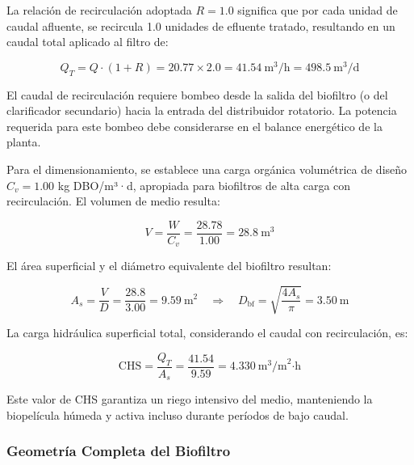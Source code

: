 \documentclass[12pt,a4paper]{article}
\begin{document}
La relación de recirculación adoptada $R = 1.0$ significa que por cada unidad de caudal afluente, se recircula 1.0 unidades de efluente tratado, resultando en un caudal total aplicado al filtro de:

\begin{equation}
Q_T = Q \cdot (1 + R) = 20.77 \times 2.0 = 41.54\ \text{m}^3\text{/h} = 498.5\ \text{m}^3\text{/d}
\end{equation}

El caudal de recirculación requiere bombeo desde la salida del biofiltro (o del clarificador secundario) hacia la entrada del distribuidor rotatorio. La potencia requerida para este bombeo debe considerarse en el balance energético de la planta.

Para el dimensionamiento, se establece una carga orgánica volumétrica de diseño $C_v = 1.00$ kg DBO/m³·d, apropiada para biofiltros de alta carga con recirculación. El volumen de medio resulta:

\begin{equation}
V = \frac{W}{C_v} = \frac{28.78}{1.00} = 28.8\ \text{m}^3
\end{equation}

El área superficial y el diámetro equivalente del biofiltro resultan:

\begin{equation}
A_s = \frac{V}{D} = \frac{28.8}{3.00} = 9.59\ \text{m}^2 \quad \Rightarrow \quad D_{\text{bf}} = \sqrt{\frac{4A_s}{\pi}} = 3.50\ \text{m}
\end{equation}

La carga hidráulica superficial total, considerando el caudal con recirculación, es:

\begin{equation}
\text{CHS} = \frac{Q_T}{A_s} = \frac{41.54}{9.59} = 4.330\ \text{m}^3\text{/m}^2\text{·h}
\end{equation}

Este valor de CHS garantiza un riego intensivo del medio, manteniendo la biopelícula húmeda y activa incluso durante períodos de bajo caudal.

\subsubsection*{Geometría Completa del Biofiltro}
\end{document}
